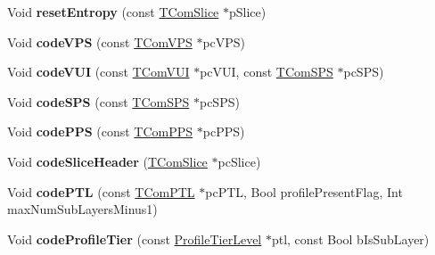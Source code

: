 \begin{DoxyCompactItemize}
\item 
\mbox{\label{class_t_enc_cavlc_a0c1a907bd2be5a4f83a4f5996b9b6978}} 
Void {\bfseries reset\+Entropy} (const \hyperlink{class_t_com_slice}{T\+Com\+Slice} $\ast$p\+Slice)
\item 
\mbox{\label{class_t_enc_cavlc_a4d9dba9153bd10078259a3d8c8d225e0}} 
Void {\bfseries code\+V\+PS} (const \hyperlink{class_t_com_v_p_s}{T\+Com\+V\+PS} $\ast$pc\+V\+PS)
\item 
\mbox{\label{class_t_enc_cavlc_a6c7f0c4f079d91919fc67445f06e5f07}} 
Void {\bfseries code\+V\+UI} (const \hyperlink{class_t_com_v_u_i}{T\+Com\+V\+UI} $\ast$pc\+V\+UI, const \hyperlink{class_t_com_s_p_s}{T\+Com\+S\+PS} $\ast$pc\+S\+PS)
\item 
\mbox{\label{class_t_enc_cavlc_a01660fad8a87e300c35fcbb4cefe54fb}} 
Void {\bfseries code\+S\+PS} (const \hyperlink{class_t_com_s_p_s}{T\+Com\+S\+PS} $\ast$pc\+S\+PS)
\item 
\mbox{\label{class_t_enc_cavlc_af045c4f4c07dc72e47fb66f4b7776a1d}} 
Void {\bfseries code\+P\+PS} (const \hyperlink{class_t_com_p_p_s}{T\+Com\+P\+PS} $\ast$pc\+P\+PS)
\item 
\mbox{\label{class_t_enc_cavlc_a8f8cfa97a6ac876e9fb70d905ccd360c}} 
Void {\bfseries code\+Slice\+Header} (\hyperlink{class_t_com_slice}{T\+Com\+Slice} $\ast$pc\+Slice)
\item 
\mbox{\label{class_t_enc_cavlc_a7e2c36ef6355b3940443ee4bcf0c89b9}} 
Void {\bfseries code\+P\+TL} (const \hyperlink{class_t_com_p_t_l}{T\+Com\+P\+TL} $\ast$pc\+P\+TL, Bool profile\+Present\+Flag, Int max\+Num\+Sub\+Layers\+Minus1)
\item 
\mbox{\label{class_t_enc_cavlc_a5a6a9393d1222df23b13dcbad67dc0e4}} 
Void {\bfseries code\+Profile\+Tier} (const \hyperlink{class_profile_tier_level}{Profile\+Tier\+Level} $\ast$ptl, const Bool b\+Is\+Sub\+Layer)
\item 
\mbox{\label{class_t_enc_cavlc_a45c19416e85263e92ab32ab4270ff312}} 

\end{DoxyCompactItemize}
